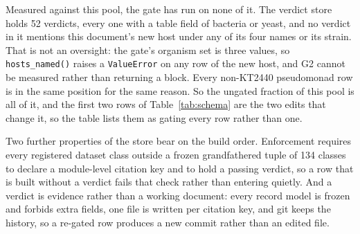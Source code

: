 Measured against this pool, the gate has run on none of it. The verdict store holds 52
verdicts, every one with a table field of bacteria or yeast, and no verdict in it mentions this
document's new host under any of its four names or its strain. That is not an oversight: the
gate's organism set is three values, so \texttt{hosts\_named()} raises a \texttt{ValueError} on
any row of the new host, and G2 cannot be measured rather than returning a block. Every
non-KT2440 pseudomonad row is in the same position for the same reason. So the ungated fraction
of this pool is all of it, and the first two rows of Table~\ref{tab:schema} are the two edits
that change it, so the table lists them as gating every row rather than one.

Two further properties of the store bear on the build order. Enforcement requires every
registered dataset class outside a frozen grandfathered tuple of 134 classes to declare a
module-level citation key and to hold a passing verdict, so a row that is built without a
verdict fails that check rather than entering quietly. And a verdict is evidence rather than a
working document: every record model is frozen and forbids extra fields, one file is written
per citation key, and git keeps the history, so a re-gated row produces a new commit rather
than an edited file.
